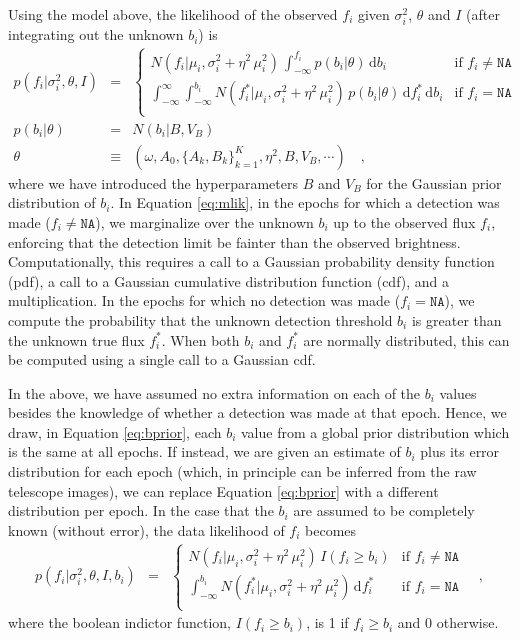 \documentclass[12pt,preprint]{aastex}
\newcommand{\dd}{\mathrm{d}}
\newcommand{\fobs}{f_i}
\newcommand{\ftrue}{f_i^*}
\begin{document}
Using the model above, the likelihood of the observed $\fobs$ given $\sigma^2_i$, $\theta$ and $I$ (after integrating out the unknown $b_i$) is
\begin{eqnarray}\displaystyle
p(\fobs |\sigma^2_i,\theta,I) &=& \left\{\begin{array}{ll}
  N(\fobs | \mu_i,  \sigma^2_i + \eta^2\,\mu_i^2)\,  \int_{-\infty}^{\fobs} p(b_i | \theta)\, \dd b_i & \mbox{if $\fobs \ne \texttt{NA}$} \\
  \int_{-\infty}^{\infty} \int_{-\infty}^{b_i} N(\ftrue | \mu_i, \sigma^2_i + \eta^2\,\mu_i^2)\, p(b_i | \theta)\, \dd \ftrue\, \dd b_i & \mbox{if $\fobs = \texttt{NA}$} \\
\end{array}\right.\label{eq:mlik}
\\
p(b_i|\theta) &=& N(b_i|B,V_B)
\label{eq:bprior}
\\
\theta &\equiv& (\omega, A_0, \{A_k, B_k\}_{k=1}^K, \eta^2, B, V_B, \cdots) \quad ,
\end{eqnarray}
where we have introduced the hyperparameters $B$ and $V_B$ for the Gaussian prior distribution of $b_i$.  In Equation \ref{eq:mlik}, in the epochs for which a detection was made ($\fobs \ne \texttt{NA}$), we marginalize over the unknown $b_i$ up to the observed flux $\fobs$, enforcing that the detection limit be fainter than the observed brightness. Computationally, this requires a call to a Gaussian probability density function (pdf), a call to a Gaussian cumulative distribution function (cdf), and a multiplication. In the epochs for which no detection was made ($\fobs = \texttt{NA}$), we compute the probability that the unknown detection threshold $b_i$ is greater than the unknown true flux $f_i^*$. When both $b_i$ and $f_i^*$ are normally distributed, this can be computed using a single call to a Gaussian cdf.

In the above, we have assumed no extra information on each of the $b_i$ values besides the knowledge of whether a detection was made at that epoch.  Hence, we draw, in Equation \ref{eq:bprior}, each $b_i$ value from a global prior distribution which is the same at all epochs.  If instead, we are given an estimate of $b_i$ plus its error distribution for each epoch (which, in principle can be inferred from the raw telescope images), we can replace Equation \ref{eq:bprior} with a different distribution per epoch.  In the case that the $b_i$ are assumed to be completely known (without error), the data likelihood of $\fobs$ becomes
\begin{eqnarray}\displaystyle
p(\fobs |\sigma^2_i,\theta,I, b_i) &=& \left\{\begin{array}{ll}
  N(\fobs | \mu_i,  \sigma^2_i + \eta^2\,\mu_i^2)\,  I(\fobs \ge b_i) & \mbox{if $\fobs \ne \texttt{NA}$} \\
 \int_{-\infty}^{b_i} N(\ftrue | \mu_i, \sigma^2_i + \eta^2\,\mu_i^2)\, \dd \ftrue & \mbox{if $\fobs = \texttt{NA}$} \\
\end{array}\right.\label{eq:mlik_s}
\quad ,
\end{eqnarray}
where the boolean indictor function, $I(\fobs \ge b_i)$, is 1 if $\fobs \ge b_i$ and 0 otherwise.
\end{document}
